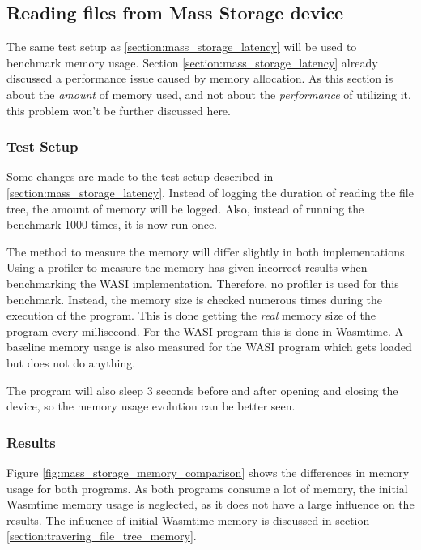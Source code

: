 \subsection{Reading files from Mass Storage device}
\label{section:reading_files_memory}
The same test setup as \ref{section:mass_storage_latency} will be used to benchmark memory usage. Section \ref{section:mass_storage_latency} already discussed a performance issue caused by memory allocation. As this section is about the \textit{amount} of memory used, and not about the \textit{performance} of utilizing it, this problem won't be further discussed here.

\subsubsection{Test Setup}
\label{section:reading_files_memory_test_setup}
Some changes are made to the test setup described in \ref{section:mass_storage_latency}. Instead of logging the duration of reading the file tree, the amount of memory will be logged. Also, instead of running the benchmark 1000 times, it is now run once.

The method to measure the memory will differ slightly in both implementations. Using a profiler to measure the memory has given incorrect results when benchmarking the \acrshort{WASI} implementation. Therefore, no profiler is used for this benchmark. Instead, the memory size is checked numerous times during the execution of the program. This is done getting the \textit{real} memory size of the program every millisecond. For the \acrshort{WASI} program this is done in Wasmtime. A baseline memory usage is also measured for the \acrshort{WASI} program which gets loaded but does not do anything.

The program will also sleep 3 seconds before and after opening and closing the device, so the memory usage evolution can be better seen.

\subsubsection{Results} 

Figure \ref{fig:mass_storage_memory_comparison} shows the differences in memory usage for both programs. As both programs consume a lot of memory, the initial Wasmtime memory usage is neglected, as it does not have a large influence on the results. The influence of initial Wasmtime memory is discussed in section \ref{section:travering_file_tree_memory}.

